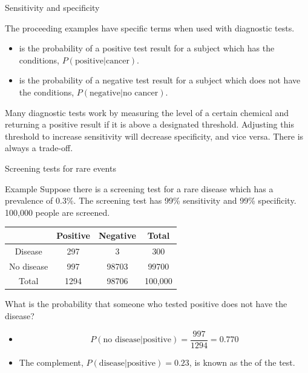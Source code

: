 \documentclass[xcolor=table, handout]{beamer}
\begin{document}
\begin{frame}{Sensitivity and specificity}
\begin{block}{}
The proceeding examples have specific terms when used with diagnostic tests.
\begin{itemize}
\pause
\item {} is the probability of a positive test result for a subject which has the conditions, $P(\text{positive}|\text{cancer})$.
\pause
\item {} is the probability of a negative test result for a subject which does not have the conditions, $P(\text{negative}|\text{no cancer})$.
\end{itemize}

\pause
Many diagnostic tests work by measuring the level of a certain chemical and returning a positive result if it is above a designated threshold. Adjusting this threshold to increase sensitivity will decrease specificity, and vice versa. There is always a trade-off.
\end{block}
\end{frame}

\begin{frame}{Screening tests for rare events}
\begin{exampleblock}{Example}
Suppose there is a screening test for a rare disease which has a prevalence of 0.3\%. The screening test has 99\% sensitivity and 99\% specificity. 100,000 people are screened.\\
\smallskip
{\centering \renewcommand{\arraystretch}{1}
\begin{tabular}{c | c  c | c}
 & Positive & Negative & Total \\
\hline
Disease & 297 & 3 & 300\\
No disease & 997 & 98703 & 99700\\
\hline
Total & 1294 & 98706 & 100,000 
\end{tabular}\par
\renewcommand{\arraystretch}{1.5}
}
\smallskip
What is the probability that someone who tested positive does not have the disease?
\begin{itemize}
\pause
\item \[P(\text{no disease} | \text{positive}) = \frac {997}{1294} = 0.770\]
\vspace*{-\baselineskip}\pause
\item The complement, $P(\text{disease} | \text{positive}) = 0.23$, is known as the  of the test.
\end{itemize}

\end{exampleblock}
\end{frame}
\end{document}
